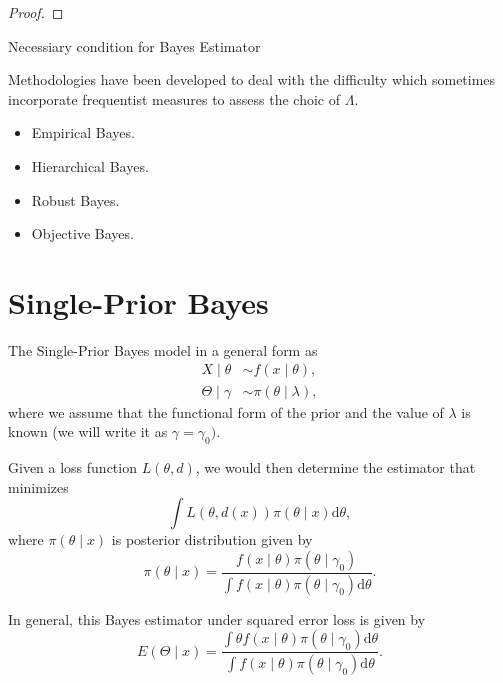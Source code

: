 \begin{proof}
    
\end{proof}

\begin{theorem}{}{}
    Necessiary condition for Bayes Estimator
\end{theorem}

Methodologies have been developed to deal with the difficulty which sometimes incorporate frequentist measures to assess the choic of $\Lambda$.

\begin{itemize}
    \item Empirical Bayes.
    \item Hierarchical Bayes.
    \item Robust Bayes.
    \item Objective Bayes.
\end{itemize}

\section{Single-Prior Bayes}

The Single-Prior Bayes model in a general form as
\begin{equation}
    \begin{aligned}
        X\mid\theta &\sim f\left(x\mid\theta\right),\\
        \Theta\mid\gamma &\sim \pi\left(\theta\mid\lambda\right),
    \end{aligned}
    \label{eq:single-prior-bayes}
\end{equation}
where we assume that the functional form of the prior and the value of $\lambda$ is known (we will write it as $\gamma=\gamma_0)$.

Given a loss function $L\left(\theta,d\right)$, we would then determine the estimator that minimizes
\begin{equation}
    \int L\left(\theta,d\left(x\right)\right)\pi\left(\theta\mid x\right)\mathrm{d}\theta,
\end{equation}
where $\pi\left(\theta\mid x\right)$ is posterior distribution given by
\begin{equation*}
    \pi\left(\theta\mid x\right)=\frac{f\left(x\mid\theta\right)\pi\left(\theta\mid\gamma_0\right)}{\int f\left(x\mid\theta\right)\pi\left(\theta\mid\gamma_0\right)\mathrm{d}\theta}.
\end{equation*}

In general, this Bayes estimator under squared error loss is given by
\begin{equation}
    E\left(\Theta\mid x\right) = \frac{\int\theta f\left(x\mid\theta\right)\pi\left(\theta\mid\gamma_0\right)\mathrm{d}\theta}{\int f\left(x\mid\theta\right)\pi\left(\theta\mid\gamma_0\right)\mathrm{d}\theta}.
\end{equation}

